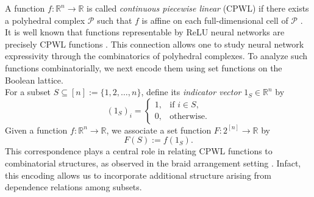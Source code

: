 \documentclass{amsart}
\theoremstyle{definition}
\begin{document}
A function $f : \mathbb{R}^n \to \mathbb{R}$ is called \emph{continuous piecewise linear} (CPWL) if there exists a polyhedral complex $\mathcal{P}$ such that $f$ is affine on each full-dimensional cell of $\mathcal{P}$ \cite{ziegler2012}.\\
\noindent
It is well known that functions representable by ReLU neural networks are precisely CPWL functions \cite{arora2018}. This connection allows one to study neural network expressivity through the combinatorics of polyhedral complexes.
To analyze such functions combinatorially, we next encode them using set functions on the Boolean lattice.\\
\noindent
For a subset $S \subseteq [n] := \{1,2,\dots,n\}$, define its \emph{indicator vector} $1_S \in \mathbb{R}^n$ by
\[
(1_S)_i =
\begin{cases}
1, & \text{if } i \in S,\\
0, & \text{otherwise}.
\end{cases}
\]
\noindent
Given a function $f : \mathbb{R}^n \to \mathbb{R}$, we associate a set function $F : 2^{[n]} \to \mathbb{R}$ by
\[
F(S) := f(1_S).
\]
\noindent
This correspondence plays a central role in relating CPWL functions to combinatorial structures, as observed in the braid arrangement setting \cite{grillo2025}. Infact, this encoding allows us to incorporate additional structure arising from dependence relations among subsets.
\end{document}
